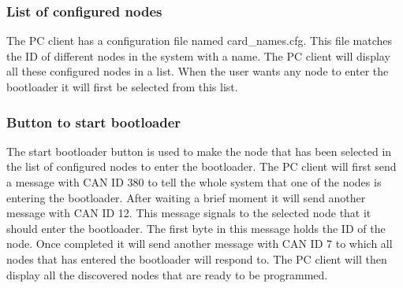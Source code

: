 \subsubsection{List of configured nodes}
The PC client has a configuration file named card\_names.cfg. This file matches the ID of different nodes in the system with a name. The PC client will display all these configured nodes in a list. When the user wants any node to enter the bootloader it will first be selected from this list.

\subsubsection{Button to start bootloader}
The start bootloader button is used to make the node that has been selected in the list of configured nodes to enter the bootloader. The PC client will first send a message with CAN ID 380 to tell the whole system that one of the nodes is entering the bootloader. After waiting a brief moment it will send another message with CAN ID 12. This message signals to the selected node that it should enter the bootloader. The first byte in this message holds the ID of the node. Once completed it will send another message with CAN ID 7 to which all nodes that has entered the bootloader will respond to. The PC client will then display all the discovered nodes that are ready to be programmed.